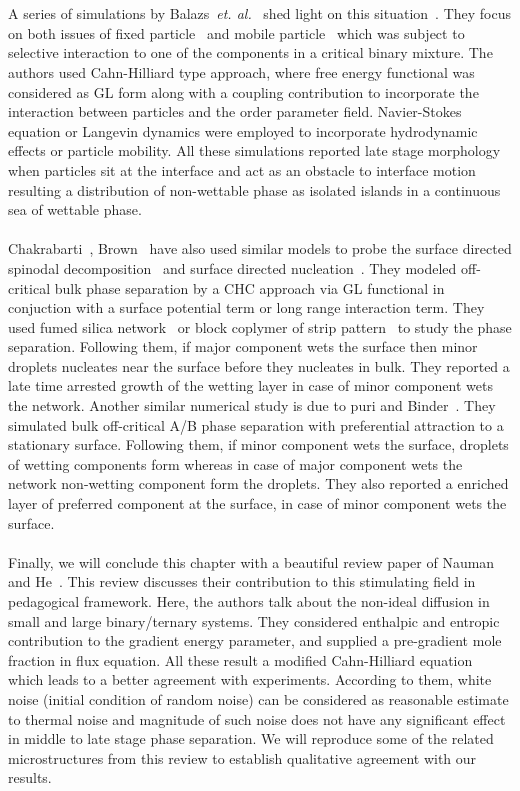\documentclass[12pt]{iiscthes}
\theoremstyle{definition}
\theoremstyle{definition}
\theoremstyle{remark}
\begin{document}
\\ \\
A series of simulations by Balazs~\emph{et. al.}~\cite{ACBalazs} shed light on this situation~\cite{DCBalazs,FCBalazs}. They focus on both issues of fixed particle~\cite{DCBalazs,FCBalazs} and mobile particle~\cite{ACBalazs} which was subject to selective interaction to one of the components in a  critical binary mixture. The authors used Cahn-Hilliard type approach, where free energy functional was considered as GL form along with a coupling contribution to incorporate the interaction between particles and the order parameter field. Navier-Stokes equation or Langevin dynamics were employed to incorporate hydrodynamic effects or particle mobility. All these simulations reported late stage morphology when particles sit at the interface and act as an obstacle to interface motion resulting a distribution of non-wettable phase as isolated islands in a continuous sea of wettable phase.     
\\ \\
Chakrabarti~\cite{Chakrabarti}, Brown~\cite{Brown,BAChakrabarti} have also used similar models to probe the surface directed spinodal decomposition~\cite{BAChakrabarti} and surface directed nucleation~\cite{Chakrabarti,Brown}. They modeled off-critical bulk phase separation by a CHC approach via GL functional in conjuction with a surface potential term or long range interaction term. They used fumed silica network~\cite{Chakrabarti} or block coplymer of strip pattern~\cite{Brown} to study the phase separation. Following them, if major component wets the surface then minor droplets nucleates near the surface before they nucleates in bulk. They reported a late time arrested growth of the wetting layer in case of minor component wets the network. Another similar numerical study is due to puri and Binder~\cite{PBinder}. They simulated bulk off-critical A/B phase separation with preferential attraction to a stationary surface. Following them, if minor component wets the surface, droplets of wetting components form whereas in case of major component wets the network non-wetting component form the droplets. They also reported a enriched layer of preferred component at the surface, in case of minor component wets the surface.  
\\ \\
Finally, we will conclude this chapter with a beautiful review paper of Nauman and He~\cite{RNauman}. This review discusses their contribution to this stimulating field in pedagogical framework. Here, the authors talk about the non-ideal diffusion in small and large binary/ternary systems. They considered enthalpic and entropic contribution to the gradient energy parameter, and supplied a pre-gradient mole fraction in flux equation. All these result a modified Cahn-Hilliard equation which leads to a better agreement with experiments. According to them, white noise (initial condition of random noise) can be considered as reasonable estimate to thermal noise and magnitude of such noise does not have any significant effect in middle to late stage phase separation. We will reproduce some of the related microstructures from this review to establish qualitative agreement with our results.
\end{document}
